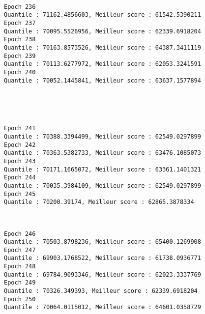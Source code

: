 \documentclass[11pt]{article}
\begin{document}
    \begin{center}
    \end{center}
    { \hspace*{\fill} \\}
    
    \begin{Verbatim}[commandchars=\\\{\}]
Epoch 236
Quantile : 71162.4856603, Meilleur score : 61542.5390211
Epoch 237
Quantile : 70095.5526956, Meilleur score : 62339.6918204
Epoch 238
Quantile : 70163.8573526, Meilleur score : 64387.3411119
Epoch 239
Quantile : 70113.6277972, Meilleur score : 62053.3241591
Epoch 240
Quantile : 70052.1445841, Meilleur score : 63637.1577894

    \end{Verbatim}

    \begin{center}
    \end{center}
    { \hspace*{\fill} \\}
    
    \begin{center}
    \end{center}
    { \hspace*{\fill} \\}
    
    \begin{Verbatim}[commandchars=\\\{\}]
Epoch 241
Quantile : 70388.3394499, Meilleur score : 62549.0297899
Epoch 242
Quantile : 70363.5382733, Meilleur score : 63476.1085073
Epoch 243
Quantile : 70171.1665072, Meilleur score : 63361.1401321
Epoch 244
Quantile : 70035.3984109, Meilleur score : 62549.0297899
Epoch 245
Quantile : 70200.39174, Meilleur score : 62865.3878334

    \end{Verbatim}

    \begin{center}
    \end{center}
    { \hspace*{\fill} \\}
    
    \begin{Verbatim}[commandchars=\\\{\}]
Epoch 246
Quantile : 70503.8798236, Meilleur score : 65400.1269908
Epoch 247
Quantile : 69903.1768522, Meilleur score : 61738.0936771
Epoch 248
Quantile : 69784.9093346, Meilleur score : 62023.3337769
Epoch 249
Quantile : 70326.349393, Meilleur score : 62339.6918204
Epoch 250
Quantile : 70064.0115012, Meilleur score : 64601.0358729

    \end{Verbatim}
\end{document}
